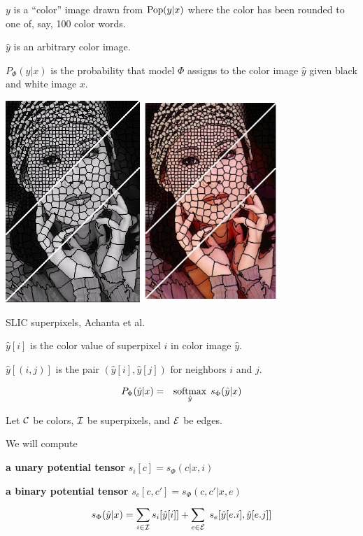 \vfill
$y$ is a ``color'' image drawn from $\mathrm{Pop}(y|x)$ where the color has been rounded to one of, say, 100 color words.

\vfill
$\hat{y}$ is an arbitrary color image.

\vfill
$P_\Phi(\hat{y}|x)$ is the probability that model $\Phi$ assigns to the color image $\hat{y}$ given black and white image $x$.

\centerline{\includegraphics[height = 3in]{../images/SLIC} \hspace{.5in} \includegraphics[height = 3in]{../images/SLICcolor}}
\centerline{\huge SLIC superpixels, Achanta et al.}

\vfill
$\hat{y}[i]$ is the color value of superpixel $i$ in color image $\hat{y}$.

\vfill
$\hat{y}[(i,j)]$ is the pair $(\hat{y}[i],\hat{y}[j])$ for neighbors $i$ and $j$.


\begin{eqnarray*}
P_\Phi(\hat{y}|x) & = & \operatorname*{softmax}_{\hat{y}}\;s_\Phi(\hat{y}|x)
\end{eqnarray*}

\vfill
Let ${\cal C}$ be colors, ${\cal I}$ be superpixels, and ${\cal E}$ be edges.

\vfill
We will compute

\vfill {\bf a unary potential tensor} $s_i[c] = s_\Phi(c|x,i)$

\vfill
{\bf a binary potential tensor} $s_e[c,c'] = s_\Phi(c,c'|x,e)$

\vfill
$$s_\Phi(\hat{y}|x) = \sum_{i \in {\cal I}} s_i[\hat{y}[i]] + \sum_{e \in {\cal E}}\;s_e[\hat{y}[e.i],\hat{y}[e.j]]$$

